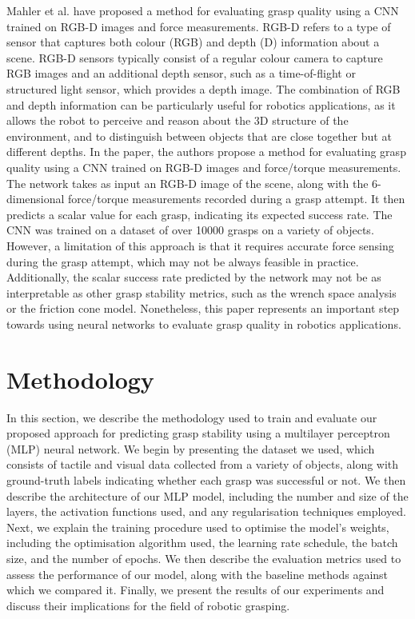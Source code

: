 \documentclass[11pt, a4paper]{report}
\begin{document}
Mahler et al. \cite{mahler2017dexnet} have proposed a method for evaluating grasp quality using a CNN trained on RGB-D images and force measurements. RGB-D refers to a type of sensor that captures both colour (RGB) and depth (D) information about a scene. RGB-D sensors typically consist of a regular colour camera to capture RGB images and an additional depth sensor, such as a time-of-flight or structured light sensor, which provides a depth image. The combination of RGB and depth information can be particularly useful for robotics applications, as it allows the robot to perceive and reason about the 3D structure of the environment, and to distinguish between objects that are close together but at different depths. In the paper, the authors propose a method for evaluating grasp quality using a CNN trained on RGB-D images and force/torque measurements. The network takes as input an RGB-D image of the scene, along with the 6-dimensional force/torque measurements recorded during a grasp attempt. It then predicts a scalar value for each grasp, indicating its expected success rate. The CNN was trained on a dataset of over 10000 grasps on a variety of objects. However, a limitation of this approach is that it requires accurate force sensing during the grasp attempt, which may not be always feasible in practice. Additionally, the scalar success rate predicted by the network may not be as interpretable as other grasp stability metrics, such as the wrench space analysis or the friction cone model. Nonetheless, this paper represents an important step towards using neural networks to evaluate grasp quality in robotics applications.


\newpage
\section{Methodology}\label{sec:5.2}
In this section, we describe the methodology used to train and evaluate our proposed approach for predicting grasp stability using a multilayer perceptron (MLP) neural network. We begin by presenting the dataset we used, which consists of tactile and visual data collected from a variety of objects, along with ground-truth labels indicating whether each grasp was successful or not. We then describe the architecture of our MLP model, including the number and size of the layers, the activation functions used, and any regularisation techniques employed. Next, we explain the training procedure used to optimise the model's weights, including the optimisation algorithm used, the learning rate schedule, the batch size, and the number of epochs. We then describe the evaluation metrics used to assess the performance of our model, along with the baseline methods against which we compared it. Finally, we present the results of our experiments and discuss their implications for the field of robotic grasping.
\end{document}
